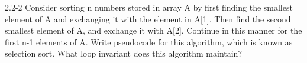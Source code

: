 2.2-2
Consider sorting n numbers stored in array A by first finding the smallest element of A and exchanging it with the element in A[1]. Then find the second  smallest element of A, and exchange it with A[2]. Continue in this manner for the first n-1 elements of A. Write pseudocode for this algorithm, which is known as selection sort. What loop invariant does this algorithm maintain? 
